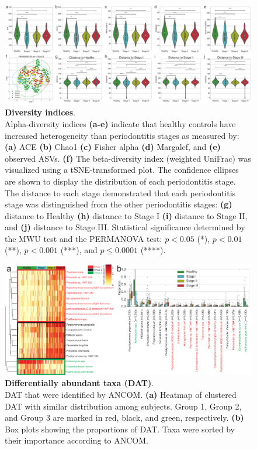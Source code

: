 \documentclass[11pt, a4paper, onecolumn, oneside]{report}
\begin{document}
            \begin{figure}[p]
                \centering
                \includegraphics[width=\linewidth]{Figures/Periodontitis/Figure_1.pdf}
                \caption[Diversity indices]{\textbf{Diversity indices}. \\
                    Alpha-diversity indices \textbf{(a-e)} indicate that healthy controls have increased heterogeneity than periodontitis stages as measured by: \textbf{(a)} ACE \textbf{(b)} Chao1 \textbf{(c)} Fisher alpha \textbf{(d)} Margalef, and \textbf{(e)} observed ASVs. \textbf{(f)} The beta-diversity index (weighted UniFrac) was visualized using a tSNE-transformed plot. The confidence ellipses are shown to display the distribution of each periodontitis stage. The distance to each stage demonstrated that each periodontitis stage was distinguished from the other periodontitis stages: \textbf{(g)} distance to Healthy \textbf{(h)} distance to Stage I \textbf{(i)} distance to Stage II, and \textbf{(j)} distance to Stage III. Statistical significance determined by the MWU test and the PERMANOVA test: $p < 0.05$ (*), $p < 0.01$ (**), $p < 0.001$ (***), and $p \le 0.0001$ (****).}
                \label{fig:Periodontitis-diversity}
            \end{figure}
            \clearpage

            \begin{figure}[p]
                \centering
                \includegraphics[width=\linewidth]{Figures/Periodontitis/Figure_2.pdf}
                \caption[Differentially abundant taxa (DAT)]{\textbf{Differentially abundant taxa (DAT)}. \\
                    DAT that were identified by ANCOM. \textbf{(a)} Heatmap of clustered DAT with similar distribution among subjects. Group 1, Group 2, and Group 3 are marked in red, black, and green, respectively. \textbf{(b)} Box plots showing the proportions of DAT. Taxa were sorted by their importance according to ANCOM.}
                \label{fig:Periodontitis-DAT}
            \end{figure}
            \clearpage
\end{document}
